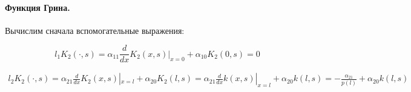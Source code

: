 \documentclass[a4paper,12pt]{article} %
\begin{document}
\paragraph{Функция Грина.}
Вычислим сначала вспомогательные выражения:

\begin{equation}
	l_1K_2(\cdot, s) =
	\alpha_{11} \frac{d}{dx}K_2(x, s)|_{x=0} + \alpha_{10} K_2(0,s)
	=
	0
\end{equation}

\begin{multline}
	l_2K_2(\cdot, s) =
	\alpha_{21} \frac{d}{dx}K_2(x, s)|_{x=l} + \alpha_{20} K_2(l,s)
	=
	\alpha_{21} \frac{d}{dx}k(x, s)|_{x=l} + \alpha_{20} k(l,s)
	=
	-\frac{\alpha_{21}}{p(l)} + \alpha_{20} k(l,s)
\end{multline}
\end{document}
